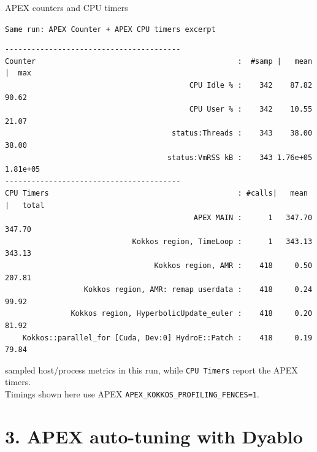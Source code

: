 \documentclass[11pt]{beamer}
\begin{document}
\begin{frame}[fragile,t]{APEX counters and CPU timers}
\small
\begin{beamerboxesrounded}[upper=terminal title,lower=terminal body,width=\linewidth,shadow=false]{%
\textcolor{red!70}{\footnotesize\textbullet}\hspace{0.15em}%
\textcolor{yellow!80}{\footnotesize\textbullet}\hspace{0.15em}%
\textcolor{green!70!black}{\footnotesize\textbullet}\hspace{0.55em}%
\texttt{\scriptsize Same run: APEX Counter + APEX CPU timers excerpt}}
\begin{lstlisting}[style=terminal,basicstyle=\ttfamily\tiny\color{termText}]
----------------------------------------
Counter                                              :  #samp |   mean  |  max
                                          CPU Idle % :    342    87.82    90.62
                                          CPU User % :    342    10.55    21.07
                                      status:Threads :    343    38.00    38.00
                                     status:VmRSS kB :    343 1.76e+05 1.81e+05
----------------------------------------
CPU Timers                                           : #calls|   mean |   total
                                           APEX MAIN :      1   347.70   347.70
                             Kokkos region, TimeLoop :      1   343.13   343.13
                                  Kokkos region, AMR :    418     0.50   207.81
                  Kokkos region, AMR: remap userdata :    418     0.24    99.92
               Kokkos region, HyperbolicUpdate_euler :    418     0.20    81.92
    Kokkos::parallel_for [Cuda, Dev:0] HydroE::Patch :    418     0.19    79.84
\end{lstlisting}
\end{beamerboxesrounded}
\vspace{0.1em}
{\scriptsize sampled host/process metrics in this run, while \texttt{CPU Timers} report the APEX timers.\\}
\vspace{0.1em}
{\tiny Timings shown here use APEX \texttt{APEX\_KOKKOS\_PROFILING\_FENCES=1}.}
\end{frame}

\section{3. APEX auto-tuning with Dyablo}
\end{document}
